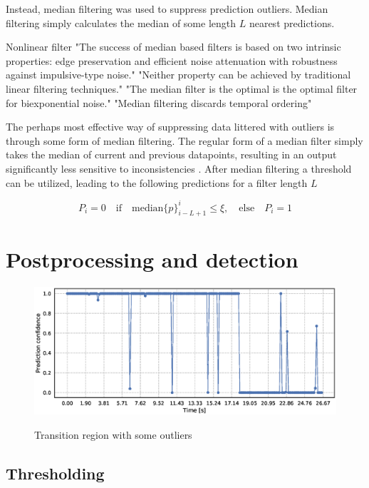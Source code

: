 Instead, median filtering was used to suppress prediction outliers. Median filtering simply calculates the median of some length $L$ nearest predictions. 


\citep{yin_yang_gabbouj_neuvo_1996}
Nonlinear filter
"The success of median based filters is based on two intrinsic properties: edge preservation and efficient noise attenuation with robustness against impulsive-type noise."
"Neither property can be achieved by traditional linear filtering techniques."
"The median filter is the optimal is the optimal filter for biexponential noise."
"Median filtering discards temporal ordering"

The perhaps most effective way of suppressing data littered with outliers is through some form of median filtering. The regular form of a median filter simply takes the median of current and previous datapoints, resulting in an output significantly less sensitive to inconsistencies \citep{pearson_2002}. After median filtering a threshold can be utilized, leading to the following predictions for a filter length $L$

\begin{equation}
	P_i=0 \quad\text{if}\quad\text{median}\{p\}_{i-L+1}^i\leq\xi, 
	\quad \text{else} \quad P_i = 1
\end{equation}


\iffalse
\section{Postprocessing and detection}


\begin{figure}
	\includegraphics[scale=0.5]{figs_temp/detect_nothing}
	\label{fig:detect_no}
	\caption{Transition region with some outliers}
\end{figure}

\subsection{Thresholding}

